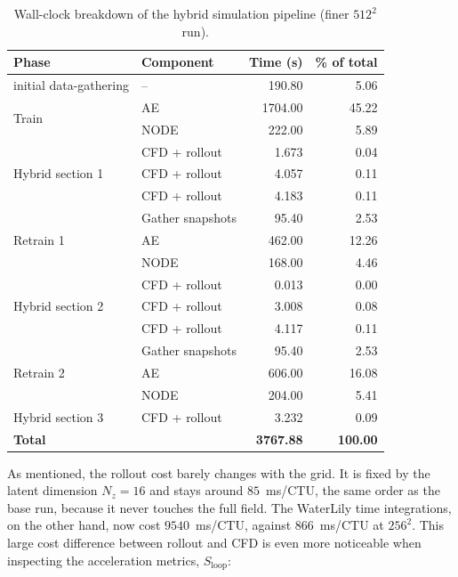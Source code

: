 \begin{table}[htp]
    \centering
    \begin{tabular}{llrr}
        \toprule
        Phase & Component & Time (s) & \% of total \\
        \midrule
        initial data-gathering & -- & 190.80 & 5.06 \\
        \midrule
        \multirow{2}{*}{Train} & AE   & 1704.00 & 45.22 \\
                               & NODE &  222.00 &  5.89 \\
        \midrule
        \multirow{3}{*}{Hybrid section 1} & CFD + rollout & 1.673 & 0.04 \\
                                          & CFD + rollout & 4.057 & 0.11 \\
                                          & CFD + rollout & 4.183 & 0.11 \\
        \midrule
        \multirow{3}{*}{Retrain 1} & Gather snapshots &  95.40 &  2.53 \\
                                   & AE               & 462.00 & 12.26 \\
                                   & NODE             & 168.00 &  4.46 \\
        \midrule
        \multirow{3}{*}{Hybrid section 2} & CFD + rollout & 0.013 & 0.00 \\
                                          & CFD + rollout & 3.008 & 0.08 \\
                                          & CFD + rollout & 4.117 & 0.11 \\
        \midrule
        \multirow{3}{*}{Retrain 2} & Gather snapshots &  95.40 &  2.53 \\
                                   & AE               & 606.00 & 16.08 \\
                                   & NODE             & 204.00 &  5.41 \\
        \midrule
        Hybrid section 3 & CFD + rollout & 3.232 & 0.09 \\
        \midrule
        \textbf{Total} & & \textbf{3767.88} & \textbf{100.00} \\
        \bottomrule
    \end{tabular}
    \caption{Wall-clock breakdown of the hybrid simulation pipeline (finer $512^2$ run).}
    \label{tab: wall_timing_hybrid_finer}
\end{table}

As mentioned, the rollout cost barely changes with the grid. It is fixed by the latent dimension $N_z = 16$ and stays around $85$~ms/CTU, the same order as the base run, because it never touches the full field. The WaterLily time integrations, on the other hand, now cost $9540$~ms/CTU, against $866$~ms/CTU at $256^2$. This large cost difference between rollout and CFD is even more noticeable when inspecting the acceleration metrics, $S_\text{loop}$: 

